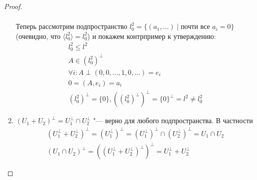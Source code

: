 \begin{proof}
\begin{enumerate}
\begin{exmp}
\begin{gather*}
			\end{gather*}
			Теперь рассмотрим подпространство
			$l^2_0 = \{(a_1, \dots) \mid \text{почти все $a_i = 0$}\}$
			(очевидно, что $\langle l^2_0 \rangle = l^2_0$) и покажем контрпример к утверждению:
			\begin{gather*}
				l_0^2 \le l^2 \\
				A \in (l_0^2)^\bot \\
				\forall i \colon A \perp (0, 0, \dots, 1, 0, \dots) = e_i \\
				0 = (A, e_i) = a_i \\
				(l_0^2)^\bot = \{0\}, ((l_0^2)^\bot)^\bot = \{0\}^\bot = l^2 \ne l_0^2
			\end{gather*}
		\end{exmp}

	\item
		$(U_1 + U_2)^\bot = U_1^\bot \cap U_2^\bot$  "--- верно для любого подпространства.
		В частности
		\begin{gather*}
			(U_1^\bot + U_2^\bot)^\bot = (U_1^\bot)^\bot = (U_1^\bot)^\bot \cap (U_2^\bot)^\bot = U_1 \cap U_2 \\
			(U_1 \cap U_2)^\bot = ((U_1^\bot + U_2^\bot)^\bot)^\bot = U_1^\bot + U_2^\bot
		\end{gather*}
	\end{enumerate}
\end{proof}
